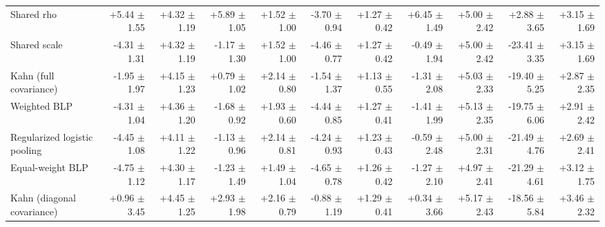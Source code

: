 \begin{tabular}{lrrrrrrrrrr}
Shared rho & +5.44 {\scriptsize $\pm$ 1.55} & +4.32 {\scriptsize $\pm$ 1.19} & +5.89 {\scriptsize $\pm$ 1.05} & +1.52 {\scriptsize $\pm$ 1.00} & -3.70 {\scriptsize $\pm$ 0.94} & +1.27 {\scriptsize $\pm$ 0.42} & +6.45 {\scriptsize $\pm$ 1.49} & +5.00 {\scriptsize $\pm$ 2.42} & +2.88 {\scriptsize $\pm$ 3.65} & +3.15 {\scriptsize $\pm$ 1.69} \\
Shared scale & -4.31 {\scriptsize $\pm$ 1.31} & +4.32 {\scriptsize $\pm$ 1.19} & -1.17 {\scriptsize $\pm$ 1.30} & +1.52 {\scriptsize $\pm$ 1.00} & -4.46 {\scriptsize $\pm$ 0.77} & +1.27 {\scriptsize $\pm$ 0.42} & -0.49 {\scriptsize $\pm$ 1.94} & +5.00 {\scriptsize $\pm$ 2.42} & -23.41 {\scriptsize $\pm$ 3.35} & +3.15 {\scriptsize $\pm$ 1.69} \\
Kahn (full covariance) & -1.95 {\scriptsize $\pm$ 1.97} & +4.15 {\scriptsize $\pm$ 1.23} & +0.79 {\scriptsize $\pm$ 1.02} & +2.14 {\scriptsize $\pm$ 0.80} & -1.54 {\scriptsize $\pm$ 1.37} & +1.13 {\scriptsize $\pm$ 0.55} & -1.31 {\scriptsize $\pm$ 2.08} & +5.03 {\scriptsize $\pm$ 2.33} & -19.40 {\scriptsize $\pm$ 5.25} & +2.87 {\scriptsize $\pm$ 2.35} \\
Weighted BLP & -4.31 {\scriptsize $\pm$ 1.04} & +4.36 {\scriptsize $\pm$ 1.20} & -1.68 {\scriptsize $\pm$ 0.92} & +1.93 {\scriptsize $\pm$ 0.60} & -4.44 {\scriptsize $\pm$ 0.85} & +1.27 {\scriptsize $\pm$ 0.41} & -1.41 {\scriptsize $\pm$ 1.99} & +5.13 {\scriptsize $\pm$ 2.35} & -19.75 {\scriptsize $\pm$ 6.06} & +2.91 {\scriptsize $\pm$ 2.42} \\
Regularized logistic pooling & -4.45 {\scriptsize $\pm$ 1.08} & +4.11 {\scriptsize $\pm$ 1.22} & -1.13 {\scriptsize $\pm$ 0.96} & +2.14 {\scriptsize $\pm$ 0.81} & -4.24 {\scriptsize $\pm$ 0.93} & +1.23 {\scriptsize $\pm$ 0.43} & -0.59 {\scriptsize $\pm$ 2.48} & +5.00 {\scriptsize $\pm$ 2.31} & -21.49 {\scriptsize $\pm$ 4.76} & +2.69 {\scriptsize $\pm$ 2.41} \\
Equal-weight BLP & -4.75 {\scriptsize $\pm$ 1.12} & +4.30 {\scriptsize $\pm$ 1.17} & -1.23 {\scriptsize $\pm$ 1.49} & +1.49 {\scriptsize $\pm$ 1.04} & -4.65 {\scriptsize $\pm$ 0.78} & +1.26 {\scriptsize $\pm$ 0.42} & -1.27 {\scriptsize $\pm$ 2.10} & +4.97 {\scriptsize $\pm$ 2.41} & -21.29 {\scriptsize $\pm$ 4.61} & +3.12 {\scriptsize $\pm$ 1.75} \\
Kahn (diagonal covariance) & +0.96 {\scriptsize $\pm$ 3.45} & +4.45 {\scriptsize $\pm$ 1.25} & +2.93 {\scriptsize $\pm$ 1.98} & +2.16 {\scriptsize $\pm$ 0.79} & -0.88 {\scriptsize $\pm$ 1.19} & +1.29 {\scriptsize $\pm$ 0.41} & +0.34 {\scriptsize $\pm$ 3.66} & +5.17 {\scriptsize $\pm$ 2.43} & -18.56 {\scriptsize $\pm$ 5.84} & +3.46 {\scriptsize $\pm$ 2.32} \\

\end{tabular}
